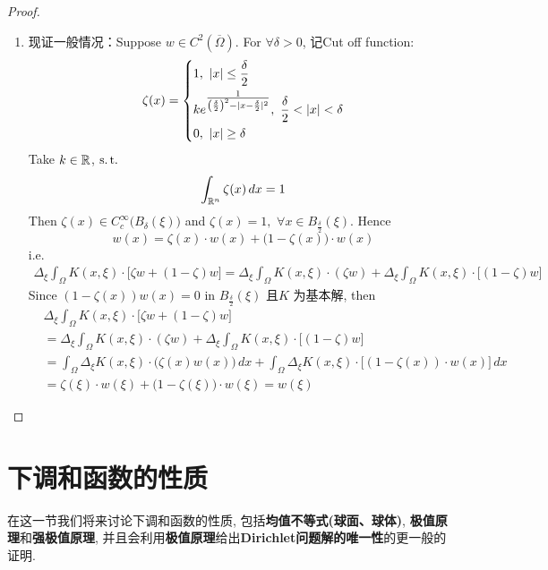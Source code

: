 \begin{proposition}
\begin{proof}
\begin{enumerate}
				\item 现证一般情况：Suppose $w \in C^2\left( \overline{\Omega} \right)$. For $\forall \delta > 0$, 记Cut off function: 
				\begin{align*}
					\zeta(x) = 
					\begin{dcases*}
						1 , \,\, | x | \leq \frac{\delta}{2} \\
						k e^{\tfrac{1}{\left( \frac{\delta}{2} \right)^2 - |x - \frac{\delta}{2}|^2}} , \,\, \frac{\delta}{2} < | x | < \delta \\
						0 , \,\, | x | \geq \delta
					\end{dcases*}
				\end{align*}
				Take $k \in \mathbb{R}$, $\operatorname{s.t.}$
				\[ \int_{\mathbb{R}^n} \zeta(x) \, dx = 1 \]
				Then $\zeta(x) \in C_{c}^{\infty} \Big( B_{\delta}(\xi) \Big)$ and $\zeta(x) = 1 , \,\, \forall x \in B_{\tfrac{\delta}{2}}(\xi)$. Hence
				\[ w(x) = \zeta(x) \cdot w(x) + \Big( 1 - \zeta(x) \Big) \cdot w(x) \]
				i.e. 
				\begin{align*}
					\Delta_{\xi} \int_{\Omega} K(x , \xi) \cdot \Big[ \zeta w + (1 - \zeta) w \Big] 
					= \Delta_{\xi} \int_{\Omega} K(x , \xi) \cdot (\zeta w) + \Delta_{\xi} \int_{\Omega} K(x , \xi) \cdot \Big[ (1 - \zeta) w \Big]
				\end{align*}
				Since $(1 - \zeta(x)) w(x) = 0$ in $B_{\tfrac{\delta}{2}}(\xi)$ 且$K$ 为基本解, then 
				\begin{align*}
					&\Delta_{\xi} \int_{\Omega} K(x , \xi) \cdot \Big[ \zeta w + (1 - \zeta) w \Big] \\
					&= \Delta_{\xi} \int_{\Omega} K(x , \xi) \cdot (\zeta w) + \Delta_{\xi} \int_{\Omega} K(x , \xi) \cdot \Big[ (1 - \zeta) w \Big] \\
					&= \int_{\Omega} \Delta_{\xi}K(x , \xi) \cdot \Big( \zeta(x) w(x) \Big) \, dx + \int_{\Omega} \Delta_{\xi} K(x , \xi) \cdot \Big[ (1 - \zeta(x)) \cdot w(x) \Big] \, dx \\
					&= \zeta(\xi) \cdot w(\xi) + \Big( 1 - \zeta(\xi) \Big) \cdot w(\xi) 
					= w(\xi)
				\end{align*}
			\end{enumerate}
		\end{proof}
	\end{proposition}

\newpage

\section{下调和函数的性质}
	在这一节我们将来讨论下调和函数的性质, 包括\textbf{均值不等式(球面、球体)}, \textbf{极值原理}和\textbf{强极值原理}, 并且会利用\textbf{极值原理}给出\textbf{Dirichlet问题解的唯一性}的更一般的证明. 
	
